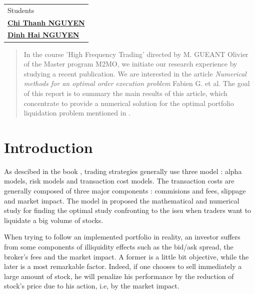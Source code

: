 \documentclass[a4paper,10pt]{article}
\begin{document}
\begin{titlepage}
\begin{tabular}{l}
Students                                                                          \\ 
\href{mailto:chithanhnguyen.math@gmail.com}{\LARGE{\textbf{Chi Thanh NGUYEN}}}    \\
\href{mailto:nqcuong32@gmail.com}{\LARGE{\textbf{Dinh Hai NGUYEN}}}
\end{tabular}



\vfill
\begin{abstract}
In the course 'High Frequency Trading' directed by M. GUEANT Olivier of the Master program M2MO, we initiate our research experience by studying a recent publication. We are interested in the article \textit{ Numerical methods for an optimal order execution problem} Fabien G. et al. The goal of this report is to summary the main results of this article, which concentrate to provide a numerical solution for the optimal portfolio liquidation problem mentioned in \cite{KP}. 
\end{abstract}
\end{titlepage}




\newpage
{}

\section{Introduction}
\par As descibed in the book \cite{NARANG}, trading strategies generally use three model : alpha models, risk models and transaction cost models. The transaction costs are generally composed of three major components : commisions and fees, slippage and market impact. The model in \cite{KP} \cite{GMP} proposed the mathematical and numerical study for finding the optimal study confronting to the issu when traders want to liquidate a big volume of stocks.      

\par When trying to follow an implemented portfolio in reality, an investor suffers from some components of illiquidity effects such as the bid/ask spread, the broker's fees and the market impact. A former is a little bit objective, while the later is a most remarkable factor. Indeed, if one chooses to sell immediately a large amount of stock, he will penalize his performance by the reduction of stock’s price due to his action, i.e, by the market impact. 
\end{document}
